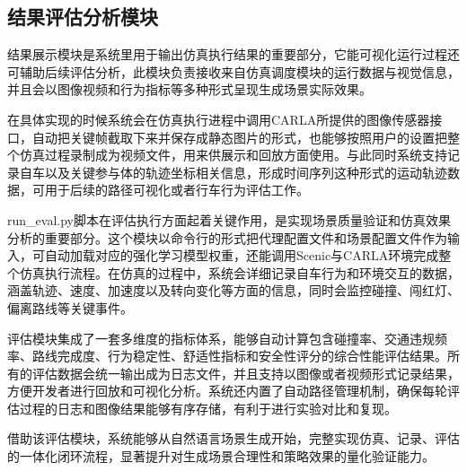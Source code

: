 \subsection{结果评估分析模块}

结果展示模块是系统里用于输出仿真执行结果的重要部分，它能可视化运行过程还可辅助后续评估分析，此模块负责接收来自仿真调度模块的运行数据与视觉信息，并且会以图像视频和行为指标等多种形式呈现生成场景实际效果。

在具体实现的时候系统会在仿真执行进程中调用CARLA所提供的图像传感器接口，自动把关键帧截取下来并保存成静态图片的形式，也能够按照用户的设置把整个仿真过程录制成为视频文件，用来供展示和回放方面使用。与此同时系统支持记录自车以及关键参与体的轨迹坐标相关信息，形成时间序列这种形式的运动轨迹数据，可用于后续的路径可视化或者行车行为评估工作。

run\_eval.py脚本在评估执行方面起着关键作用，是实现场景质量验证和仿真效果分析的重要部分。这个模块以命令行的形式把代理配置文件和场景配置文件作为输入，可自动加载对应的强化学习模型权重，还能调用Scenic与CARLA环境完成整个仿真执行流程。在仿真的过程中，系统会详细记录自车行为和环境交互的数据，涵盖轨迹、速度、加速度以及转向变化等方面的信息，同时会监控碰撞、闯红灯、偏离路线等关键事件。

评估模块集成了一套多维度的指标体系，能够自动计算包含碰撞率、交通违规频率、路线完成度、行为稳定性、舒适性指标和安全性评分的综合性能评估结果。所有的评估数据会统一输出成为日志文件，并且支持以图像或者视频形式记录结果，方便开发者进行回放和可视化分析。系统还内置了自动路径管理机制，确保每轮评估过程的日志和图像结果能够有序存储，有利于进行实验对比和复现。

借助该评估模块，系统能够从自然语言场景生成开始，完整实现仿真、记录、评估的一体化闭环流程，显著提升对生成场景合理性和策略效果的量化验证能力。





